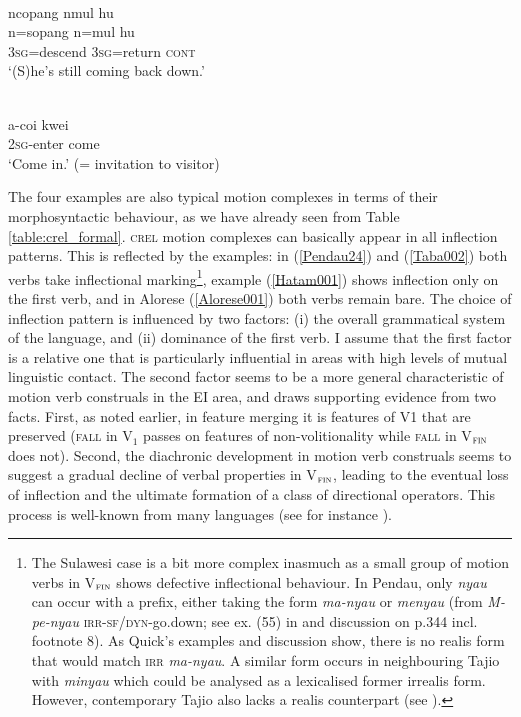 \ea \label{Taba002}
\\
\glll ncopang nmul hu \\
n=sopang n=mul hu \\
\textsc{3}\textsc{sg}=descend \textsc{3}\textsc{sg}=return \textsc{cont} \\
\glft `(S)he's still coming back down.'\\ 
\z

\ea \label{Hatam001}
\\
\gll a-coi kwei \\
\textsc{2}\textsc{sg}-enter come \\
\glft `Come in.' (= invitation to visitor)\\ 
\z

The four examples are also typical motion complexes in terms of their morphosyntactic behaviour, as we have already seen from Table \ref{table:crel_formal}. \textsc{crel} motion complexes can basically appear in all inflection patterns. This is reflected by the examples: in (\ref{Pendau24}) and (\ref{Taba002}) both verbs take inflectional marking\footnote{The Sulawesi case is a bit more complex inasmuch as a small group of motion verbs in V$_{\textsc{fin}}$ shows defective inflectional behaviour. In Pendau, only \textit{nyau} can occur with a prefix, either taking the form \textit{ma-nyau} or \textit{menyau} (from \textit{M-pe-nyau} \textsc{irr}-\textsc{sf/dyn}-go.down; see ex. (55) in \citealt[342]{Quick2007} and discussion on p.344 incl. footnote 8). As Quick's examples and discussion show, there is no realis form that would match \textsc{irr} \textit{ma-nyau}. A similar form occurs in neighbouring Tajio with \textit{minyau} which could be analysed as a lexicalised former irrealis form. However, contemporary Tajio also lacks a realis counterpart (see \citealt[136]{mayani2013grammar}).}, example (\ref{Hatam001}) shows inflection only on the first verb, and in Alorese (\ref{Alorese001}) both verbs remain bare. The choice of inflection pattern is influenced by two factors: (i) the overall grammatical system of the language, and (ii) dominance of the first verb. I assume that the first factor is a relative one that is particularly influential in areas with high levels of mutual linguistic contact. The second factor seems to be a more general characteristic of motion verb construals in the EI area, and draws supporting evidence from two facts. First, as noted earlier, in feature merging it is features of V1 that are preserved (\textsc{fall} in V$_{1}$ passes on features of non-volitionality while \textsc{fall} in V$_{\textsc{fin}}$ does not). Second, the diachronic development in motion verb construals seems to suggest a gradual decline of verbal properties in V$_{\textsc{fin}}$, leading to the eventual loss of inflection and the ultimate formation of a class of directional operators. This process is well-known from many languages (see for instance \citealt[31]{Aikhenvald2006}).

